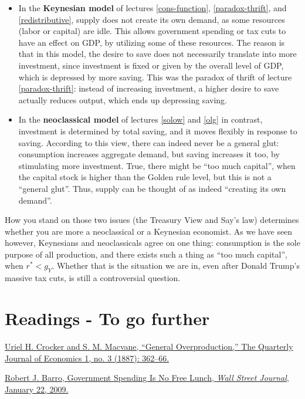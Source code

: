 \documentclass[]{book}
\begin{document}
\begin{itemize}
\item
  In the \textbf{Keynesian model} of lectures \ref{cons-function},
  \ref{paradox-thrift}, and \ref{redistributive}, supply does not create
  its own demand, as some resources (labor or capital) are idle. This
  allows government spending or tax cuts to have an effect on GDP, by
  utilizing some of these resources. The reason is that in this model,
  the desire to save does not necessarily translate into more
  investment, since investment is fixed or given by the overall level of
  GDP, which is depressed by more saving. This was the paradox of thrift
  of lecture \ref{paradox-thrift}: instead of increasing investment, a
  higher desire to save actually reduces output, which ends up
  depressing saving.
\item
  In the \textbf{neoclassical model} of lectures \ref{solow} and
  \ref{olg} in contrast, investment is determined by total saving, and
  it moves flexibly in response to saving. According to this view, there
  can indeed never be a general glut: consumption increases aggregate
  demand, but saving increases it too, by stimulating more investment.
  True, there might be ``too much capital'', when the capital stock is
  higher than the Golden rule level, but this is not a ``general glut''.
  Thus, supply can be thought of as indeed ``creating its own demand''.
\end{itemize}

How you stand on those two issues (the Treasury View and Say's law)
determines whether you are more a neoclassical or a Keynesian economist.
As we have seen however, Keynesians and neoclassicals agree on one
thing: consumption is the sole purpose of all production, and there
exists such a thing as ``too much capital'', when \(r^{*}<g_Y\). Whether
that is the situation we are in, even after Donald Trump's massive tax
cuts, is still a controversial question.

\section*{Readings - To go further}\label{readings---to-go-further-9}

\href{https://doi.org/10.2307/1882763}{Uriel H. Crocker and S. M.
Macvane, ``General Overproduction,'' The Quarterly Journal of Economics
1, no. 3 (1887): 362--66.}

\href{https://search.proquest.com/docview/399114897/CBD1D9A468D04A85PQ/2?accountid=14512}{Robert
J. Barro, Government Spending Is No Free Lunch, \emph{Wall Street
Journal}, January 22, 2009.}
\end{document}
